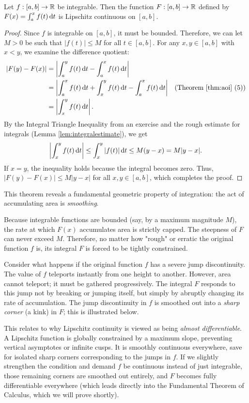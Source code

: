 \documentclass[../analysis1.tex]{subfiles}
\begin{document}
\begin{theorem}
    \begin{shaded*}
        Let $f:[a,b]\to\mathbb{R}$ be integrable. Then the function $F:[a,b]\to\mathbb{R}$ defined by $F(x) = \int_a^x f(t) \d{t}$ is Lipschitz continuous on $[a,b]$.
    \end{shaded*}
\end{theorem}
\begin{proof}
    Since $f$ is integrable on $[a,b]$, it must be bounded. Therefore, we can let $M > 0$ be such that $|f(t)| \le M$ for all $t \in [a,b]$. For any $x, y \in [a,b]$ with $x < y$, we examine the difference quotient:
    \begin{align*}
    |F(y) - F(x)| &= \left| \int_a^y f(t) \d t - \int_a^x f(t) \d t \right|\\
    &= \left|\int_a^x f(t)\d{t} +\int_x^y f(t)\d{t} -\int_a^x f(t)\d{t}\right|&(\text{Theorem }\ref{thm:aoi}\text{ (5)})\\
    & = \left| \int_x^y f(t) \d t \right|.
    \end{align*}
    By the Integral Triangle Inequality from an exercise and the rough estimate for integrals (Lemma \ref{lem:integralestimate}), we get
    \[ \left| \int_x^y f(t) \d t \right| \le \int_x^y |f(t)| \d t \le M(y - x) = M|y - x|. \]
    If $x=y$, the inequality holds because the integral becomes zero. Thus, $|F(y) - F(x)| \le M|y - x|$ for all $x, y \in [a,b]$, which completes the proof.\qedhere
\end{proof}

\begin{remark}
    This theorem reveals a fundamental geometric property of integration: the act of accumulating area is \textit{smoothing}. 
    
    Because integrable functions are bounded (say, by a maximum magnitude $M$), the rate at which $F(x)$ accumulates area is strictly capped. The steepness of $F$ can never exceed $M$. Therefore, no matter how "rough" or erratic the original function $f$ is, its integral $F$ is forced to be tightly constrained.
    
    Consider what happens if the original function $f$ has a severe jump discontinuity. The value of $f$ teleports instantly from one height to another. However, area cannot teleport; it must be gathered progressively. The integral $F$ responds to this jump not by breaking or jumping itself, but simply by abruptly changing its rate of accumulation. The jump discontinuity in $f$ is smoothed out into a \textit{sharp corner} (a kink) in $F$; this is illustrated below.
    
    This relates to why Lipschitz continuity is viewed as being \textit{almost differentiable}. A Lipschitz function is globally constrained by a maximum slope, preventing vertical asymptotes or infinite cusps. It is smoothly continuous everywhere, save for isolated sharp corners corresponding to the jumps in $f$. If we slightly strengthen the condition and demand $f$ be continuous instead of just integrable, those remaining corners are smoothed out entirely, and $F$ becomes fully differentiable everywhere (which leads directly into the Fundamental Theorem of Calculus, which we will prove shortly).
\end{remark}
\end{document}
